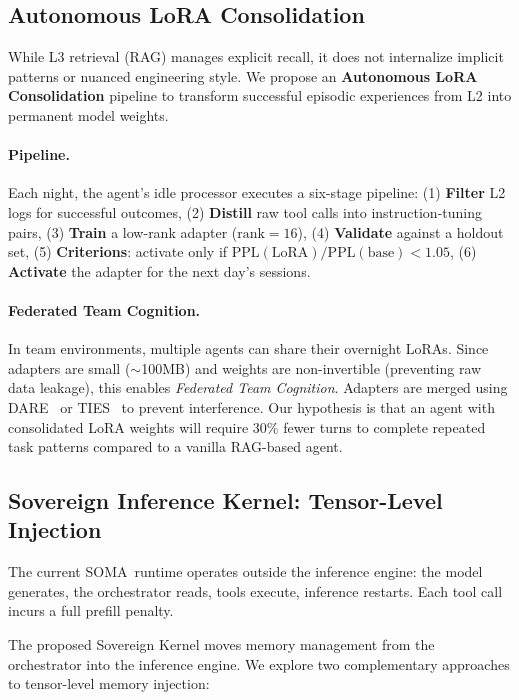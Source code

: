 \documentclass[11pt,a4paper]{article}
\newcommand{\soma}{\textsc{SOMA}}
\begin{document}
\subsection{Autonomous LoRA Consolidation}

While L3 retrieval (RAG) manages explicit recall, it does not internalize
implicit patterns or nuanced engineering style.
We propose an \textbf{Autonomous LoRA Consolidation} pipeline to
transform successful episodic experiences from L2 into permanent
model weights.

\paragraph{Pipeline.}
Each night, the agent's idle processor executes a six-stage pipeline:
(1) \textbf{Filter} L2 logs for successful outcomes,
(2) \textbf{Distill} raw tool calls into instruction-tuning pairs,
(3) \textbf{Train} a low-rank adapter ($\text{rank}=16$),
(4) \textbf{Validate} against a holdout set,
(5) \textbf{Criterions}: activate only if $\text{PPL}(\text{LoRA}) / \text{PPL}(\text{base}) < 1.05$,
(6) \textbf{Activate} the adapter for the next day's sessions.

\paragraph{Federated Team Cognition.}
In team environments, multiple agents can share their overnight LoRAs.
Since adapters are small ($\sim$100MB) and weights are non-invertible
(preventing raw data leakage), this enables \emph{Federated Team Cognition}.
Adapters are merged using DARE~\cite{yu2023dare} or TIES~\cite{yadav2023ties}
to prevent interference.
Our hypothesis is that an agent with consolidated LoRA weights will
require 30\% fewer turns to complete repeated task patterns compared
to a vanilla RAG-based agent.

\subsection{Sovereign Inference Kernel: Tensor-Level Injection}

The current \soma\ runtime operates outside the inference engine:
the model generates, the orchestrator reads, tools execute, inference
restarts.
Each tool call incurs a full prefill penalty.

The proposed Sovereign Kernel moves memory management from the
orchestrator into the inference engine.
We explore two complementary approaches to tensor-level memory injection:
\end{document}

